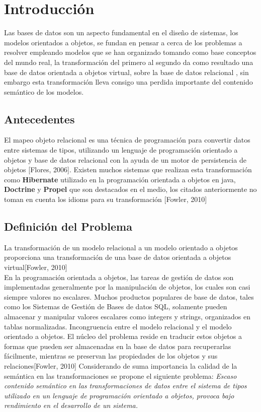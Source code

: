 
\chapter{Introducción}
\noindent Las bases de datos son un aspecto fundamental en el diseño de sistemas, los modelos orientados a objetos,
\noindent se fundan en pensar a cerca de los problemas a resolver empleando modelos que se han organizado tomando como base conceptos del mundo real,
\noindent la transformación del primero al segundo da como resultado una base de datos orientada a objetos virtual, sobre la base de datos relacional , sin embargo esta transformación lleva consigo una perdida importante del contenido semántico de los modelos.
\section{Antecedentes}
\noindent El mapeo objeto relacional es una técnica de programación para convertir datos entre sistemas de tipos, utilizando un lenguaje de programación orientado a objetos y base de datos relacional con la ayuda de un motor de persistencia de objetos [Flores, 2006].
\noindent Existen muchos sistemas que realizan esta transformación como \textbf{Hibernate} utilizado en la programación orientada a objetos en java, \textbf{Doctrine} y \textbf{Propel} que son destacados en el medio,
\noindent los citados anteriormente no toman en cuenta los idioms para su transformación [Fowler, 2010]\\
\section{Definición del Problema}
\noindent La transformación de un modelo relacional a un modelo orientado a objetos proporciona una transformación de una
\noindent base de datos orientada a objetos virtual[Fowler, 2010] \\
\noindent En la programación orientada a objetos, las tareas de gestión de datos son implementadas generalmente por la
\noindent manipulación de objetos, los cuales son casi siempre valores no escalares.
\noindent Muchos productos populares de base de datos, tales como los Sistemas de Gestión de Bases de datos SQL, solamente
\noindent pueden almacenar y manipular valores escalares como integers y strings, organizados en tablas normalizadas.
\noindent Incongruencia entre el modelo relacional y el modelo orientado a objetos. El núcleo del problema reside en traducir
\noindent estos objetos a formas que pueden ser almacenadas en la base de datos para recuperarlas fácilmente, mientras se
\noindent preservan las propiedades de los objetos y sus relaciones[Fowler, 2010]
\noindent Considerando de  suma importancia la calidad de la semántica en las transformaciones se propone el siguiente problema:
\noindent \texbf\textit{Escaso contenido semántico en las transformaciones de datos entre el sistema de tipos utilizado
\noindent en un lenguaje de programación orientado a objetos, provoca bajo rendimiento en el desarrollo de un sistema.}

